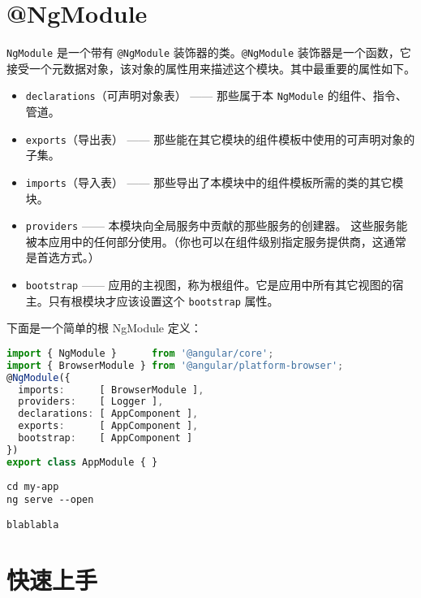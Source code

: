 \documentclass{codedump}
\begin{document}
\section{\ttfamily @NgModule }

\verb|NgModule| 是一个带有 \verb|@NgModule| 装饰器的类。\verb|@NgModule| 装饰器是一个函数，它接受一个元数据对象，该对象的属性用来描述这个模块。其中最重要的属性如下。

\begin{itemize}
  \item \verb|declarations|（可声明对象表） —— 那些属于本 \verb|NgModule| 的组件、指令、管道。
  
  \item \verb|exports|（导出表） —— 那些能在其它模块的组件模板中使用的可声明对象的子集。
  
  \item \verb|imports|（导入表） —— 那些导出了本模块中的组件模板所需的类的其它模块。
  
  \item \verb|providers| —— 本模块向全局服务中贡献的那些服务的创建器。 这些服务能被本应用中的任何部分使用。（你也可以在组件级别指定服务提供商，这通常是首选方式。）
  
  \item \verb|bootstrap| —— 应用的主视图，称为根组件。它是应用中所有其它视图的宿主。只有根模块才应该设置这个 \verb|bootstrap| 属性。
\end{itemize}


下面是一个简单的根 NgModule 定义：

\begin{lstlisting}[language=TypeScript,caption={src/app/app.module.ts}]
import { NgModule }      from '@angular/core';
import { BrowserModule } from '@angular/platform-browser';
@NgModule({
  imports:      [ BrowserModule ],
  providers:    [ Logger ],
  declarations: [ AppComponent ],
  exports:      [ AppComponent ],
  bootstrap:    [ AppComponent ]
})
export class AppModule { }
\end{lstlisting}

\begin{lstlisting}[style=bashInputStyle]
cd my-app
ng serve --open
\end{lstlisting}

\begin{lstlisting}[style=bashOutputStyle]
blablabla
\end{lstlisting}

\section{快速上手}
\end{document}
